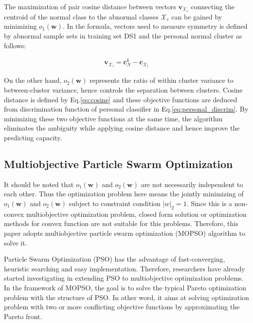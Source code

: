 The maximization of pair cosine distance between vectors $\mathbf{v}_{\mathcal{X}_c}$ connecting the centroid of the normal class to the abnormal classes $\mathcal{X}_c$ can be gained by minimizing $o_1(\mathbf{w})$. In the formula, vectors used to measure symmetry is defined by abnormal sample sets in training set DS1 and the personal normal cluster as follows:

\begin{align}
\mathbf{v}_{\mathcal{X}_i} = \mathbf{c}^k_N -  \mathbf{c}_{\mathcal{X}_i}
\end{align}

On the other hand, $o_2(\mathbf{w})$ represents the ratio of within cluster variance to between-cluster variance, hence controls the separation between clusters. Cosine distance is defined by Eq.\ref{eq:cosine} and these objective functions are deduced from discrimination function of personal classifier in Eq.\ref{eq:personal_discrim}. By minimizing these two objective functions at the same time, the algorithm eliminates the ambiguity while applying cosine distance and hence improve the predicting capacity.

\subsection{Multiobjective Particle Swarm Optimization}

It should be noted that $o_1(\mathbf{w}) $ and $o_2(\mathbf{w})$ are not necessarily independent to each other. Thus the optimization problem here means the jointly minimizing of $o_1(\mathbf{w}) $ and $o_2(\mathbf{w})$ subject to constraint condition $|w|_2=1$. Since this is a non-convex multiobjective optimization problem, closed form solution or optimization methods for convex function are not suitable for this problems. Therefore, this paper adopts multiobjective particle swarm optimization (MOPSO) algorithm to solve it.

Particle Swarm Optimization (PSO) has the advantage of fast-converging, heuristic searching and easy implementation\cite{coello2002mopso, alvarez2005mopso}. Therefore, researchers have already started investigating in extending PSO to multiobjective optimization problems. In the framework of MOPSO, the goal is to solve the typical Pareto optimization problem with the structure of PSO. In other word, it aims at solving optimization problem with two or more conflicting objective functions by approximating the Pareto front. 



